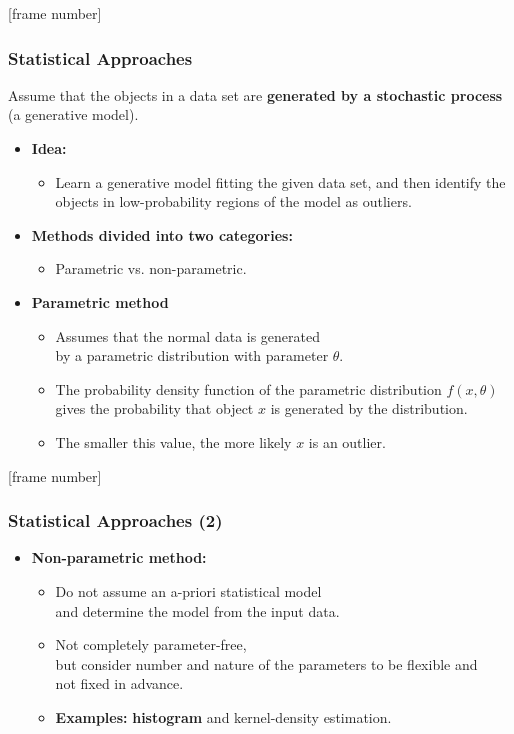 \documentclass[aspectratio=169,t,xcolor=dvipsnames]{beamer}
\begin{document}
{
[frame number]
\begin{frame}
	\frametitle{Statistical Approaches}
	Assume that the objects in a data set are \textbf{\color{airforceblue}generated by a stochastic process} (a generative model).
	\begin{itemize}
	\item \textbf{Idea:}
	\begin{itemize}
		\item Learn a generative model fitting the given data set, and then identify the objects in low-probability regions of the model as outliers.
	\end{itemize}
	\item \textbf{Methods divided into two categories:}
	\begin{itemize}
		\item Parametric vs. non-parametric.
	\end{itemize}
	\item \textbf{Parametric method}
	\begin{itemize}
		\item Assumes that the normal data is generated \\
    by a parametric distribution with parameter $\theta$.
		\item The probability density function of the parametric distribution $f(x, \theta)$ \\
    gives the probability that object $x$ is generated by the distribution.
		\item The smaller this value, the more likely $x$ is an outlier.
	\end{itemize}
	\end{itemize}
\end{frame}
}

{
[frame number]
\begin{frame}
  \frametitle{Statistical Approaches (2)}
  \begin{itemize}
    \item \textbf{Non-parametric method:}
          \begin{itemize}
            \item Do not assume an a-priori statistical model \\
                  and determine the model from the input data.
            \item Not completely parameter-free, \\
                  but consider number and nature of the parameters to be flexible and \\ not fixed in advance.
            \item \textbf{Examples:} \textbf{\color{airforceblue}histogram} and kernel-density estimation.
          \end{itemize}
  \end{itemize}
\end{frame}
}
\end{document}
